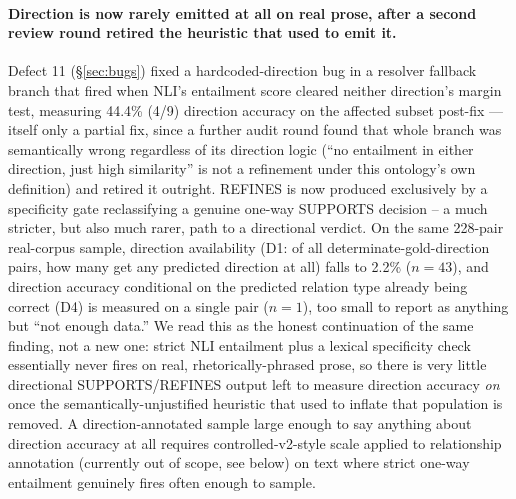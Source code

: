 \paragraph{Direction is now rarely emitted at all on real prose, after a
second review round retired the heuristic that used to emit it.} Defect
11 (\S\ref{sec:bugs}) fixed a hardcoded-direction bug in a resolver
fallback branch that fired when NLI's entailment score cleared neither
direction's margin test, measuring 44.4\% (4/9) direction accuracy on the
affected subset post-fix --- itself only a partial fix, since a further
audit round found that whole branch was semantically wrong
regardless of its direction logic (``no entailment in either direction,
just high similarity'' is not a refinement under this ontology's own
definition) and retired it outright. REFINES is now produced exclusively
by a specificity gate reclassifying a genuine one-way SUPPORTS decision
-- a much stricter, but also much rarer, path to a directional verdict.
On the same 228-pair real-corpus sample, direction availability (D1: of
all determinate-gold-direction pairs, how many get any predicted
direction at all) falls to 2.2\% ($n=43$), and direction accuracy
conditional on the predicted relation type already being correct (D4)
is measured on a single pair ($n=1$), too small to report as anything
but ``not enough data.'' We read this as the honest continuation of the
same finding, not a new one: strict NLI entailment plus a lexical
specificity check essentially never fires on real, rhetorically-phrased
prose, so there is very little directional SUPPORTS/REFINES output left
to measure direction accuracy \emph{on} once the semantically-unjustified
heuristic that used to inflate that population is removed. A
direction-annotated sample large enough to say anything about direction
accuracy at all requires controlled-v2-style scale applied to
relationship annotation (currently out of scope, see below) on text
where strict one-way entailment genuinely fires often enough to sample.



